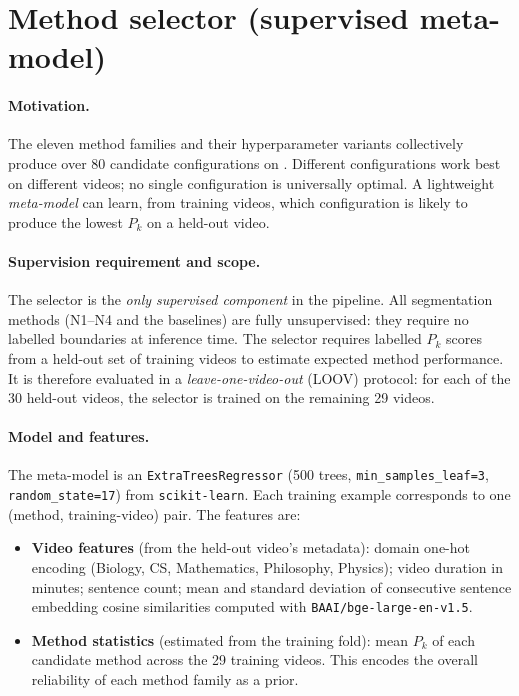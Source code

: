 \section{Method selector (supervised meta-model)}
\label{sec:selector}

\paragraph{Motivation.}
The eleven method families and their hyperparameter variants collectively
produce over 80 candidate configurations on \dataset{}.
Different configurations work best on different videos; no single
configuration is universally optimal.
A lightweight \emph{meta-model} can learn, from training videos, which
configuration is likely to produce the lowest $P_k$ on a held-out video.

\paragraph{Supervision requirement and scope.}
The selector is the \emph{only supervised component} in the \lecseg{}
pipeline.
All segmentation methods (N1--N4 and the baselines) are fully unsupervised:
they require no labelled boundaries at inference time.
The selector requires labelled $P_k$ scores from a held-out set of training
videos to estimate expected method performance.
It is therefore evaluated in a \emph{leave-one-video-out} (LOOV) protocol:
for each of the 30 held-out videos, the selector is trained on the remaining
29 videos.

\paragraph{Model and features.}
The meta-model is an \texttt{ExtraTreesRegressor} (500 trees,
\texttt{min\_samples\_leaf=3}, \texttt{random\_state=17})
from \texttt{scikit-learn}.
Each training example corresponds to one (method, training-video) pair.
The features are:

\begin{itemize}
  \item \textbf{Video features} (from the held-out video's metadata):
    domain one-hot encoding (Biology, CS, Mathematics, Philosophy, Physics);
    video duration in minutes; sentence count; mean and standard deviation of
    consecutive sentence embedding cosine similarities computed with
    \texttt{BAAI/bge-large-en-v1.5}.
  \item \textbf{Method statistics} (estimated from the training fold):
    mean $P_k$ of each candidate method across the 29 training videos.
    This encodes the overall reliability of each method family as a prior.
\end{itemize}

